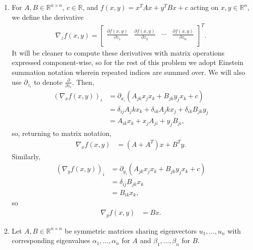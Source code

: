 \documentclass[11pt,letterpaper]{article}
\newcommand{\pd}[2]{\frac{\partial #1}{\partial #2}}
\numberwithin{equation}{section}
\numberwithin{figure}{section}
\begin{document}
\begin{enumerate}
	\item For $A,B \in \mathbb{R}^{n\times n}$, $c \in \mathbb{R}$, and $f(x,y) = x^T A x + y^T B x + c$ acting on $x,y \in \mathbb{R}^n$, we define the derivative
	\begin{align*}
		\nabla_z f(x,y) = \begin{bmatrix}\pd{f(x,y)}{z_1} & \pd{f(x,y)}{z_2} & \cdots & \pd{f(x,y)}{z_n}\\\end{bmatrix}^T.
	\end{align*}
	It will be cleaner to compute these derivatives with matrix operations expressed component-wise, so for the rest of this problem we adopt Einstein summation notation wherein repeated indices are summed over. We will also use $\partial_{z_i}$ to denote $\pd{}{z_i}$. Then,
	\begin{align*}
		(\nabla_x f(x,y))_i &= \partial_{x_i} \left(A_{jk} x_j x_k + B_{jk} y_j x_k + c\right)\\
		&= \delta_{ij} A_jk x_k + \delta_{ik} A_jk x_j + \delta_{ik} B_{jk} y_j\\
		&= A_{ik} x_k + x_j A_{ji} + y_j B_{ji},
	\end{align*}
	so, returning to matrix notation,
	\begin{align}
		\nabla_x f(x,y) &= (A+A^T)x +B^Ty.
	\end{align}
	Similarly,
	\begin{align*}
		(\nabla_y f(x,y))_i &= \partial_{y_i} \left(A_{jk} x_j x_k + B_{jk} y_j x_k + c\right)\\
		&= \delta_{ij} B_{jk} x_k\\
		&= B_{ik} x_k,
	\end{align*}
	so
	\begin{align*}
		\nabla_y f(x,y) &= Bx.
	\end{align*}








	\item Let $A,B \in \mathbb{R}^{n\times n}$ be symmetric matrices sharing eigenvectors $u_1,\ldots,u_n$ with corresponding eigenvalues $\alpha_1,\ldots,\alpha_n$ for $A$ and $\beta_1,\ldots,\beta_n$ for $B$.


\end{enumerate}
\end{document}
